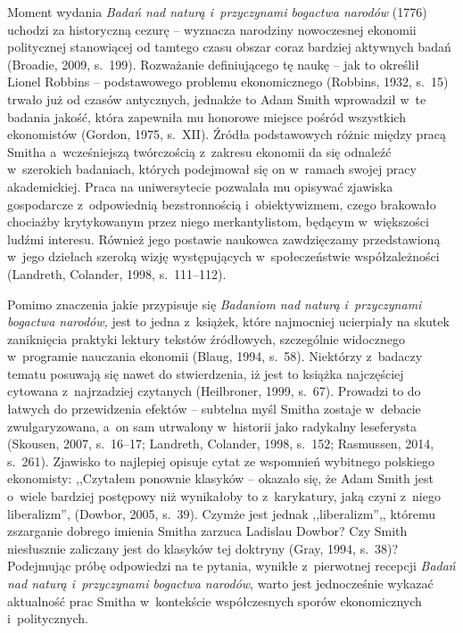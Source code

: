 Moment wydania \textit{Badań nad naturą i~przyczynami bogactwa narodów} (1776) uchodzi za historyczną cezurę -- wyznacza narodziny nowoczesnej ekonomii politycznej stanowiącej od tamtego czasu obszar coraz bardziej aktywnych badań \label{ref:RNDxlNYKcaRLz}(Broadie, 2009, s.~199). Rozważanie definiującego tę naukę -- jak to określił Lionel Robbins -- podstawowego problemu ekonomicznego \label{ref:RNDnxuF1ebG8p}(Robbins, 1932, s.~15) trwało już od czasów antycznych, jednakże to Adam Smith wprowadził w~te badania jakość, która zapewniła mu honorowe miejsce pośród wszystkich ekonomistów \label{ref:RNDXwmhFbTJ5B}(Gordon, 1975, s.~XII). Źródła podstawowych różnic między pracą Smitha a~wcześniejszą twórczością z~zakresu ekonomii da się odnaleźć w~szerokich badaniach, których podejmował się on w~ramach swojej pracy akademickiej. Praca na uniwersytecie pozwalała mu opisywać zjawiska gospodarcze z~odpowiednią bezstronnością i~obiektywizmem, czego brakowało chociażby krytykowanym przez niego merkantylistom, będącym w~większości ludźmi interesu. Również jego postawie naukowca zawdzięczamy przedstawioną w~jego dziełach szeroką wizję występujących w~społeczeństwie współzależności \label{ref:RNDQbbqHBuaQg}(Landreth, Colander, 1998, s.~111–112).

Pomimo znaczenia jakie przypisuje się \textit{Badaniom nad naturą i~przyczynami bogactwa narodów,} jest to jedna z~książek, które najmocniej ucierpiały na skutek zaniknięcia praktyki lektury tekstów źródłowych, szczególnie widocznego w~programie nauczania ekonomii \label{ref:RNDwb8UrvF6xd}(Blaug, 1994, s.~58). Niektórzy z~badaczy tematu posuwają się nawet do stwierdzenia, iż jest to książka najczęściej cytowana z~najrzadziej czytanych \label{ref:RNDhU0CYVU7xS}(Heilbroner, 1999, s.~67). Prowadzi to do łatwych do przewidzenia efektów -- subtelna myśl Smitha zostaje w~debacie zwulgaryzowana, a~on sam utrwalony w~historii jako radykalny leseferysta \label{ref:RNDllaqGb90E5}(Skousen, 2007, s.~16–17; Landreth, Colander, 1998, s.~152; Rasmussen, 2014, s.~261). Zjawisko to najlepiej opisuje cytat ze wspomnień wybitnego polskiego ekonomisty: ,,Czytałem ponownie klasyków -- okazało się, że Adam Smith jest o~wiele bardziej postępowy niż wynikałoby to z~karykatury, jaką czyni z~niego liberalizm'',\textstyleFootnoteCharacters{} \label{ref:RNDuVHaEp23gh}(Dowbor, 2005, s.~39). Czymże jest jednak ,,liberalizm'',, któremu zszarganie dobrego imienia Smitha zarzuca Ladislau Dowbor? Czy Smith niesłusznie zaliczany jest do klasyków tej doktryny \label{ref:RNDk1CfNtw5Df}(Gray, 1994, s.~38)? Podejmując próbę odpowiedzi na te pytania, wynikłe z~pierwotnej recepcji \textit{Badań nad naturą i~przyczynami bogactwa narodów}, warto jest jednocześnie wykazać aktualność prac Smitha w~kontekście współczesnych sporów ekonomicznych i~politycznych.

